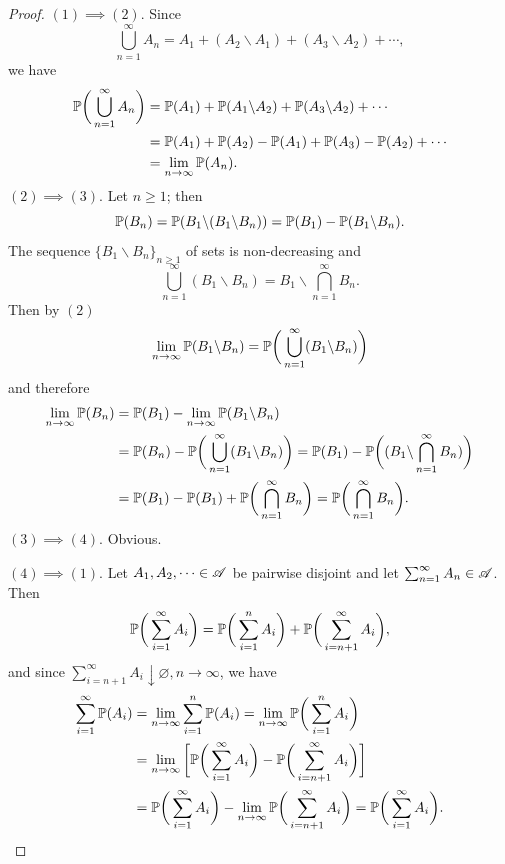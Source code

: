 \begin{proof}
$(1) \implies (2)$. Since
\begin{equation*}
    \bigcup_{n=1}^\infty A_n = A_1 + (A_2\backslash A_1) + (A_3\backslash A_2) + \cdots,
\end{equation*}
we have
\begin{align*}
    \mathbb{P} \bigg( \bigcup_{n=1}^\infty A_n \bigg) &= \mathbb{P}(A_1) + \mathbb{P}(A_1\backslash A_2) + \mathbb{P}(A_3\backslash A_2) + \cdots\\
    &= \mathbb{P}(A_1) + \mathbb{P}(A_2) - \mathbb{P}(A_1) + \mathbb{P}(A_3) - \mathbb{P}(A_2) + \cdots\\
    &= \lim_{n\rightarrow \infty} \mathbb{P}(A_n).
\end{align*}
$(2) \implies (3)$. Let $n \ge 1$; then
\begin{equation*}
    \mathbb{P}(B_n) = \mathbb{P}(B_1 \backslash (B_1 \backslash B_n)) = \mathbb{P} (B_1) - \mathbb{P}(B_1 \backslash B_n).
\end{equation*}
The sequence $\{ B_1 \backslash B_n \}_{n\ge1}$ of sets is non-decreasing and 
\begin{equation*}
    \bigcup_{n=1}^\infty (B_1 \backslash B_n) = B_1 \backslash \bigcap_{n=1}^\infty B_n.
\end{equation*}
Then by $(2)$
\begin{equation*}
    \lim_{n \rightarrow \infty} \mathbb{P}(B_1 \backslash B_n) = \mathbb{P} \bigg( \bigcup_{n=1}^\infty (B_1 \backslash B_n)\bigg)
\end{equation*}
and therefore
\begin{align*}
    \lim_{n \rightarrow \infty} \mathbb{P}(B_n) &= \mathbb{P}(B_1) - \lim_{n \rightarrow \infty} \mathbb{P}(B_1 \backslash B_n)\\
    &= \mathbb{P}(B_n) - \mathbb{P} \bigg( \bigcup_{n=1}^\infty (B_1 \backslash B_n)\bigg) = \mathbb{P}(B_1) - \mathbb{P} \bigg( (B_1 \backslash \bigcap_{n=1}^\infty B_n)\bigg)\\
    &= \mathbb{P} (B_1) - \mathbb{P} (B_1) + \mathbb{P} \bigg( \bigcap_{n=1}^\infty  B_n\bigg) = \mathbb{P} \bigg( \bigcap_{n=1}^\infty  B_n\bigg).
\end{align*}
$(3) \implies (4)$. Obvious.

$(4) \implies (1)$. Let $A_1, A_2, \dots \in \mathcal{A}$ be pairwise disjoint and let $ \sum_{n=1}^\infty A_n \in \mathcal{A}$. Then 
\begin{equation*}
    \mathbb{P} \bigg( \sum_{i=1}^\infty A_i \bigg) = \mathbb{P} \bigg( \sum_{i=1}^n A_i\bigg) + \mathbb{P} \bigg( \sum_{i=n+1}^\infty A_i \bigg),
\end{equation*}
and since $\sum_{i=n+1}^\infty A_i \downarrow \varnothing, n\rightarrow \infty$, we have 
\begin{align*}
    \sum_{i=1}^\infty \mathbb{P}(A_i) &= \lim_{n \rightarrow \infty} \sum_{i=1}^n \mathbb{P}(A_i) = \lim_{n \rightarrow \infty} \mathbb{P} \bigg( \sum_{i=1}^n A_i\bigg)\\
    &= \lim_{n \rightarrow \infty} \bigg[ \mathbb{P}\bigg( \sum_{i=1}^\infty A_i\bigg) - \mathbb{P}\bigg( \sum_{i=n+1}^\infty A_i\bigg) \bigg]\\
    &= \mathbb{P} \bigg( \sum_{i=1}^\infty A_i \bigg) - \lim_{n \rightarrow \infty}  \mathbb{P} \bigg( \sum_{i=n+1}^\infty A_i \bigg) =  \mathbb{P} \bigg( \sum_{i=1}^\infty A_i \bigg).
\end{align*}
\end{proof}



